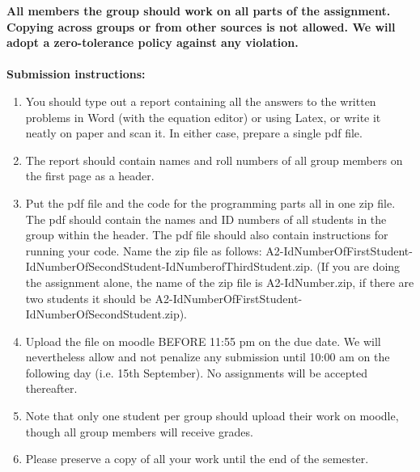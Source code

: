 \documentclass[11pt]{article}
\begin{document}
\maketitle

\textbf{All members the group should work on all parts of the assignment. Copying across groups or from other sources is not allowed. We will adopt a \textbf{zero-tolerance policy} against any violation.}
\\
\\
\textbf{Submission instructions:} 
\begin{enumerate}
\item You should type out a report containing all the answers to the written problems in Word (with the equation editor) or using Latex, or write it neatly on paper and scan it. In either case, prepare a single pdf file. 
\item The report should contain names and roll numbers of all group members on the first page as a header.
\item Put the pdf file and the code for the programming parts all in one zip file. The pdf should contain the names and ID numbers of all students in the group within the header. The pdf file should also contain instructions for running your code. Name the zip file as follows: A2-IdNumberOfFirstStudent-IdNumberOfSecondStudent-IdNumberofThirdStudent.zip. (If you are doing the assignment alone, the name of the zip file is A2-IdNumber.zip, if there are two students it should be A2-IdNumberOfFirstStudent-IdNumberOfSecondStudent.zip). 
\item Upload the file on moodle BEFORE 11:55 pm on the due date. We will nevertheless allow and not penalize any submission until 10:00 am on the following day (i.e. 15th September). No assignments will be accepted thereafter. 
\item Note that only one student per group should upload their work on moodle, though all group members will receive grades. 
\item Please preserve a copy of all your work until the end of the semester. 
\end{enumerate}
\end{document}
